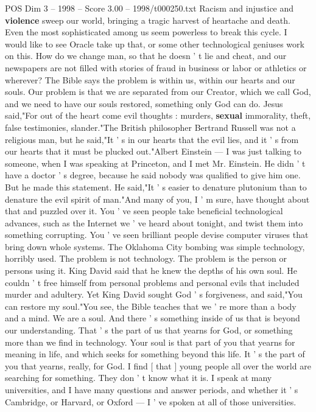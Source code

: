 \begin{textsample}{POS Dim 3 – 1998 – Score 3.00 – 1998/t000250.txt}
Racism and injustice and \textbf{violence} sweep our world, bringing a tragic harvest of heartache and death.
Even the most sophisticated among us seem powerless to break this cycle.
I would like to see Oracle take up that, or some other technological geniuses work on this.
How do we change man, so that he doesn ' t lie and cheat, and our newspapers are not filled with stories of fraud in business or labor or athletics or wherever?
The Bible says the problem is within us, within our hearts and our souls.
Our problem is that we are separated from our Creator, which we call God, and we need to have our souls restored, something only God can do.
Jesus said,"For out of the heart come evil thoughts : murders, \textbf{sexual} immorality, theft, false testimonies, slander."The British philosopher Bertrand Russell was not a religious man, but he said,"It ' s in our hearts that the evil lies, and it ' s from our hearts that it must be plucked out."Albert Einstein — I was just talking to someone, when I was speaking at Princeton, and I met Mr.
Einstein.
He didn ' t have a doctor ' s degree, because he said nobody was qualified to give him one.
But he made this statement.
He said,"It ' s easier to denature plutonium than to denature the evil spirit of man."And many of you, I ' m sure, have thought about that and puzzled over it.
You ' ve seen people take beneficial technological advances, such as the Internet we ' ve heard about tonight, and twist them into something corrupting.
You ' ve seen brilliant people devise computer viruses that bring down whole systems.
The Oklahoma City bombing was simple technology, horribly used.
The problem is not technology.
The problem is the person or persons using it.
King David said that he knew the depths of his own soul.
He couldn ' t free himself from personal problems and personal evils that included murder and adultery.
Yet King David sought God ' s forgiveness, and said,"You can restore my soul."You see, the Bible teaches that we ' re more than a body and a mind.
We are a soul.
And there ' s something inside of us that is beyond our understanding.
That ' s the part of us that yearns for God, or something more than we find in technology.
Your soul is that part of you that yearns for meaning in life, and which seeks for something beyond this life.
It ' s the part of you that yearns, really, for God.
I find [ that ] young people all over the world are searching for something.
They don ' t know what it is.
I speak at many universities, and I have many questions and answer periods, and whether it ' s Cambridge, or Harvard, or Oxford — I ' ve spoken at all of those universities.

\end{textsample}
